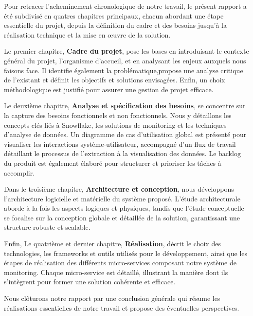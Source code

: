 \par Pour retracer l'acheminement chronologique de notre travail, le présent rapport a été subdivisé en quatres chapitres 
principaux, chacun abordant une étape essentielle du projet, depuis la définition du cadre et des besoins jusqu'à la réalisation
 technique et la mise en œuvre de la solution.
 \par Le premier chapitre, \textbf{Cadre du projet}, pose les bases en introduisant le contexte général du projet, l'organisme d'accueil, 
 et en analysant les enjeux auxquels nous faisons face. Il identifie également la problématique,propose une analyse critique
  de l'existant et définit les objectifs et solutions envisagées. Enfin, un choix méthodologique est justifié pour assurer une 
  gestion de projet efficace.
\par Le deuxième chapitre, \textbf{Analyse et spécification des besoins}, se concentre sur la capture des besoins fonctionnels 
et non fonctionnels. Nous y détaillons les concepts clés liés à Snowflake, les solutions de monitoring et les techniques
d'analyse de données. Un diagramme de cas d'utilisation global est présenté pour visualiser les interactions système-utilisateur,
accompagné d'un flux de travail détaillant le processus de l'extraction à la visualisation des données.
Le backlog du produit est également élaboré pour structurer et prioriser les tâches à accomplir.
\par Dans le troisième chapitre, \textbf{Architecture et conception}, nous développons l'architecture logicielle et matérielle du système
 proposé. L'étude architecturale aborde à la fois les aspects logiques et physiques,
 tandis que l'étude conceptuelle se focalise sur la conception globale et détaillée de la solution, garantissant une structure robuste et scalable.\\
 \par Enfin, Le quatrième et dernier chapitre, \textbf{Réalisation}, décrit le choix des technologies, les frameworks et outils utilisés
  pour le développement, ainsi que les étapes de réalisation des différents micro-services composant notre système de monitoring.
   Chaque micro-service est détaillé, illustrant la manière dont ils s'intègrent pour former une solution cohérente et efficace.
   \par Nous clôturons notre rapport par une conclusion générale qui résume les réalisations essentielles de notre travail et propose des éventuelles perspectives.